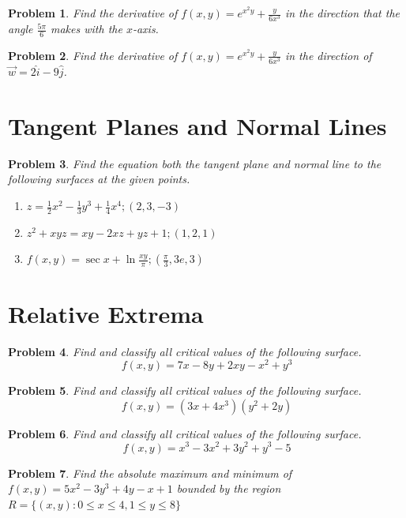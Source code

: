 \documentclass[11pt]{article}
\newtheorem{problem}{Problem}
\begin{document}
\begin{problem}
Find the derivative of $f(x,y) = e^{x^2y}+\frac{y}{6x^3}$ in the direction that the angle $\frac{5\pi}{6}$ makes with the $x$-axis.
\end{problem}

\begin{problem}
Find the derivative of $f(x,y) = e^{x^2y}+\frac{y}{6x^3}$ in the direction of $\vec{w} = 2 \hat{i} - 9\hat{j}$.
\end{problem}

\section{Tangent Planes and Normal Lines}

\begin{problem}
Find the equation both the tangent plane and normal line to the following surfaces at the given points.

\begin{enumerate}
    \item $z = \frac{1}{2}x^2-\frac{1}{3}y^3+\frac{1}{4}x^4; (2,3, -3)$
    \item $z^2 + xyz = xy-2xz+yz+1 ; (1,2,1)$
    \item $f(x,y) = \sec{x}+\ln{\frac{xy}{\pi}}; (\frac{\pi}{3}, 3e,3)$
\end{enumerate}
\end{problem}


\section{Relative Extrema}

\begin{problem}
Find and classify all critical values of the following surface. \[f(x,y) = 7x-8y+2xy-x^2+y^3 \]
\end{problem}



\begin{problem}
Find and classify all critical values of the following surface. \[f(x,y)=(3x+4x^3)(y^2+2y)\]
\end{problem}

\begin{problem}
Find and classify all critical values of the following surface. \[f(x,y) = x^3 - 3x^2 + 3y^2 + y^3 - 5\]
\end{problem}


\begin{problem}
 Find the absolute maximum and minimum of $f(x,y) = 5x^2-3y^3+4y-x+1$ bounded by the region $R = \{(x,y) : 0\leq x\leq 4, 1\leq y\leq 8\}$   
\end{problem}
   
\end{document}
